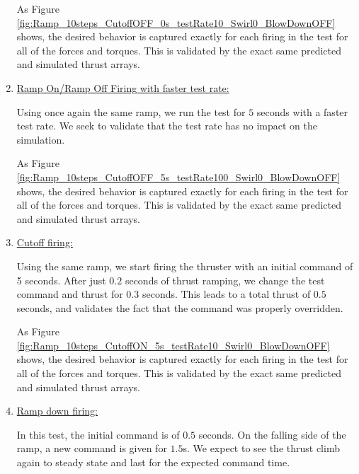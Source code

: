 \begin{enumerate}
	As Figure \ref{fig:Ramp_10steps_CutoffOFF_0s_testRate10_Swirl0_BlowDownOFF} shows, the desired behavior is captured exactly for each
	firing in the test for all of the forces and torques. This is validated by the exact same predicted and simulated thrust arrays.

	\item{\underline{Ramp On/Ramp Off Firing with faster test rate:} }

	

	Using once again the same ramp, we run the test for $5$ seconds with a faster test rate. We seek to validate that the test rate has no impact on the simulation.

	

	As Figure \ref{fig:Ramp_10steps_CutoffOFF_5s_testRate100_Swirl0_BlowDownOFF} shows, the desired behavior is captured exactly for each
	firing in the test for all of the forces and torques. This is validated by the exact same predicted and simulated thrust arrays.

	\item{\underline{Cutoff firing:}}

	

	Using the same ramp, we start firing the thruster with an initial command of 5 seconds. After just $0.2$ seconds of thrust ramping, we change the test command and thrust for $0.3$ seconds. This leads to a total thrust of $0.5$ seconds, and validates the fact that the command was properly overridden.

	

	As Figure \ref{fig:Ramp_10steps_CutoffON_5s_testRate10_Swirl0_BlowDownOFF} shows, the desired behavior is captured exactly for each
	firing in the test for all of the forces and torques. This is validated by the exact same predicted and simulated thrust arrays.

	\item{\underline{Ramp down firing:}}

	

	In this test, the initial command is of $0.5$ seconds. On the falling side of the ramp, a new command is given for $1.5$s. We expect to see the thrust climb again to steady state and last for the expected command time.


\end{enumerate}
